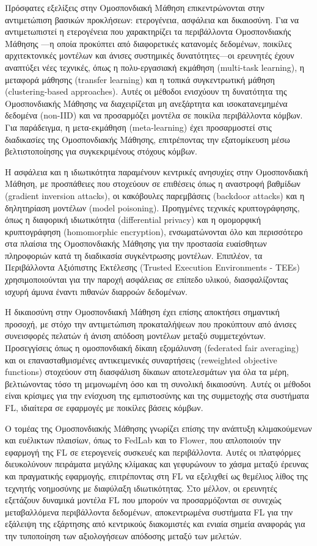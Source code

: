 Πρόσφατες εξελίξεις στην Ομοσπονδιακή Μάθηση επικεντρώνονται στην αντιμετώπιση βασικών προκλήσεων: ετερογένεια, ασφάλεια και δικαιοσύνη. Για να αντιμετωπιστεί η ετερογένεια που χαρακτηρίζει τα περιβάλλοντα Ομοσπονδιακής Μάθησης —η οποία προκύπτει από διαφορετικές κατανομές δεδομένων, ποικίλες αρχιτεκτονικές μοντέλων και άνισες συστημικές δυνατότητες—οι ερευνητές έχουν αναπτύξει νέες τεχνικές, όπως η πολυ-εργασιακή εκμάθηση (multi-task learning), η μεταφορά μάθησης (transfer learning) και η τοπικά συγκεντρωτική μάθηση (clustering-based approaches). Αυτές οι μέθοδοι ενισχύουν τη δυνατότητα της Ομοσπονδιακής Μάθησης να διαχειρίζεται μη ανεξάρτητα και ισοκατανεμημένα δεδομένα (non-IID) και να προσαρμόζει μοντέλα σε ποικίλα περιβάλλοντα κόμβων. Για παράδειγμα, η μετα-εκμάθηση (meta-learning) έχει προσαρμοστεί στις διαδικασίες της Ομοσπονδιακής Μάθησης, επιτρέποντας την εξατομίκευση μέσω βελτιστοποίησης για συγκεκριμένους στόχους κόμβων.

Η ασφάλεια και η ιδιωτικότητα παραμένουν κεντρικές ανησυχίες στην Ομοσπονδιακή Μάθηση, με προσπάθειες που στοχεύουν σε επιθέσεις όπως η αναστροφή βαθμίδων (gradient inversion attacks), οι κακόβουλες παρεμβάσεις (backdoor attacks) και η δηλητηρίαση μοντέλων (model poisoning). Προηγμένες τεχνικές κρυπτογράφησης, όπως η διαφορική ιδιωτικότητα (differential privacy) και η ομομορφική κρυπτογράφηση (homomorphic encryption), ενσωματώνονται όλο και περισσότερο στα πλαίσια της Ομοσπονδιακής Μάθησης για την προστασία ευαίσθητων πληροφοριών κατά τη διαδικασία συγκέντρωσης μοντέλων. Επιπλέον, τα Περιβάλλοντα Αξιόπιστης Εκτέλεσης (Trusted Execution Environments - TEEs) χρησιμοποιούνται για την παροχή ασφάλειας σε επίπεδο υλικού, διασφαλίζοντας ισχυρή άμυνα έναντι πιθανών διαρροών δεδομένων.

Η δικαιοσύνη στην Ομοσπονδιακή Μάθηση έχει επίσης αποκτήσει σημαντική προσοχή, με στόχο την αντιμετώπιση προκαταλήψεων που προκύπτουν από άνισες συνεισφορές πελατών ή άνιση απόδοση μοντέλων μεταξύ συμμετεχόντων. Προσεγγίσεις όπως η ομοσπονδιακή δίκαιη εξομάλυνση (federated fair averaging) και οι επανασταθμισμένες αντικειμενικές συναρτήσεις (reweighted objective functions) στοχεύουν στη διασφάλιση δίκαιων αποτελεσμάτων για όλα τα μέρη, βελτιώνοντας τόσο τη μεμονωμένη όσο και τη συνολική δικαιοσύνη. Αυτές οι μέθοδοι είναι κρίσιμες για την ενίσχυση της εμπιστοσύνης και της συμμετοχής στα συστήματα FL, ιδιαίτερα σε εφαρμογές με ποικίλες βάσεις κόμβων.

Ο τομέας της Ομοσπονδιακής Μάθησης γνωρίζει επίσης την ανάπτυξη κλιμακούμενων και ευέλικτων πλαισίων, όπως το FedLab και το Flower, που απλοποιούν την εφαρμογή της FL σε ετερογενείς συσκευές και περιβάλλοντα. Αυτές οι πλατφόρμες διευκολύνουν πειράματα μεγάλης κλίμακας και γεφυρώνουν το χάσμα μεταξύ έρευνας και πραγματικής εφαρμογής, επιτρέποντας στη FL να εξελιχθεί ως θεμέλιος λίθος της τεχνητής νοημοσύνης με διαφύλαξη ιδιωτικότητας. Στο μέλλον, οι ερευνητές εξετάζουν δυναμικά μοντέλα FL που μπορούν να προσαρμόζονται σε συνεχώς μεταβαλλόμενα περιβάλλοντα δεδομένων, αποκεντρωμένα συστήματα FL για την εξάλειψη της εξάρτησης από κεντρικούς διακομιστές και ενιαία σημεία αναφοράς για την τυποποίηση των αξιολογήσεων απόδοσης μεταξύ των μελετών.

